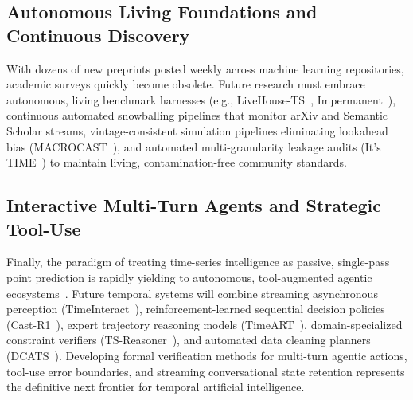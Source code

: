 \subsection{Autonomous Living Foundations and Continuous Discovery}
With dozens of new preprints posted weekly across machine learning repositories, academic surveys quickly become obsolete. Future research must embrace autonomous, living benchmark harnesses (e.g., LiveHouse-TS~\cite{wen2026livehouse}, Impermanent~\cite{garza2026impermanent}), continuous automated snowballing pipelines that monitor arXiv and Semantic Scholar streams, vintage-consistent simulation pipelines eliminating lookahead bias (MACROCAST~\cite{carriero2026macrocast}), and automated multi-granularity leakage audits (It's TIME~\cite{qiao2026time}) to maintain living, contamination-free community standards.

\subsection{Interactive Multi-Turn Agents and Strategic Tool-Use}
Finally, the paradigm of treating time-series intelligence as passive, single-pass point prediction is rapidly yielding to autonomous, tool-augmented agentic ecosystems~\cite{kong2026timesagemt}. Future temporal systems will combine streaming asynchronous perception (TimeInteract~\cite{pan2026timeinteract}), reinforcement-learned sequential decision policies (Cast-R1~\cite{tao2026castr1}), expert trajectory reasoning models (TimeART~\cite{wu2026timeart}), domain-specialized constraint verifiers (TS-Reasoner~\cite{ye2024tsreasoner}), and automated data cleaning planners (DCATS~\cite{yeh2025dcats}). Developing formal verification methods for multi-turn agentic actions, tool-use error boundaries, and streaming conversational state retention represents the definitive next frontier for temporal artificial intelligence.


